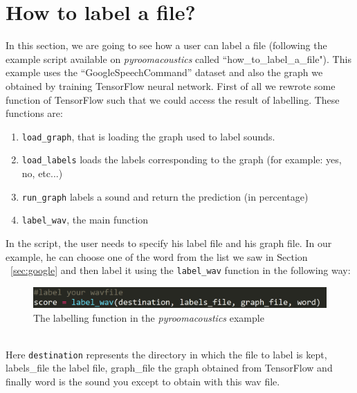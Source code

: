 \documentclass[11pt,a4paper,titlepage]{report}
\providecommand{\tightlist}{%
	\setlength{\itemsep}{0pt}\setlength{\parskip}{0pt}}
\begin{document}
\section{How to label a file?}
\label{sec:label_file}
\hspace*{0.6cm}
In this section, we are going to see how a user can label a file (following the example script available on \textit{pyroomacoustics} called ``how\_to\_label\_a\_file"). This example uses the ``GoogleSpeechCommand'' dataset and also the graph we obtained by training TensorFlow neural network.
First of all we rewrote some function of TensorFlow such that we could access the result of labelling. These functions are:
\begin{enumerate}
	\tightlist
	\item \texttt{load\_graph}, that is loading the graph used to label sounds.
	\item \texttt{load\_labels} loads the labels corresponding to the graph (for example: yes, no, etc...)
	\item \texttt{run\_graph} labels a sound and return the prediction (in percentage)
	\item \texttt{label\_wav}, the main function
\end{enumerate}
\hspace*{0.6cm}
In the script, the user needs to specify his label file and his graph file. In our example, he can choose one of the word from the list we saw in Section ~\ref{sec:google} and then label it using the \texttt{label\_wav} function in the following way:
\begin{figure}[h!]
	\centering
	\includegraphics[width=0.7\linewidth]{Rapport8}
	\caption{The labelling function in the \textit{pyroomacoustics} example}
	\label{fig:rapport8}
\end{figure}\\

Here \texttt{destination} represents the directory in which the file to label is kept, labels\_file the label file, graph\_file the graph obtained from TensorFlow and finally word is the sound you except to obtain with this wav file.
\end{document}
